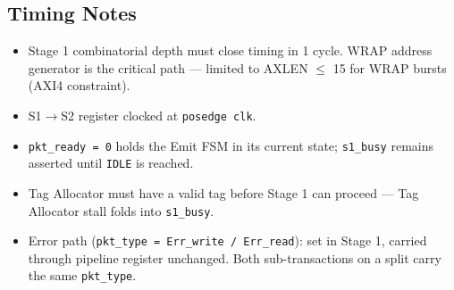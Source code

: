 \subsection{Timing Notes}

\begin{itemize}[noitemsep]
  \item Stage 1 combinatorial depth must close timing in 1 cycle. WRAP address generator is the critical path --- limited to AXLEN $\leq$ 15 for WRAP bursts (AXI4 constraint).
  \item S1$\rightarrow$S2 register clocked at \texttt{posedge clk}.
  \item \texttt{pkt\_ready = 0} holds the Emit FSM in its current state; \texttt{s1\_busy} remains asserted until \texttt{IDLE} is reached.
  \item Tag Allocator must have a valid tag before Stage 1 can proceed --- Tag Allocator stall folds into \texttt{s1\_busy}.
  \item Error path (\texttt{pkt\_type = Err\_write / Err\_read}): set in Stage 1, carried through pipeline register unchanged. Both sub-transactions on a split carry the same \texttt{pkt\_type}.
\end{itemize}